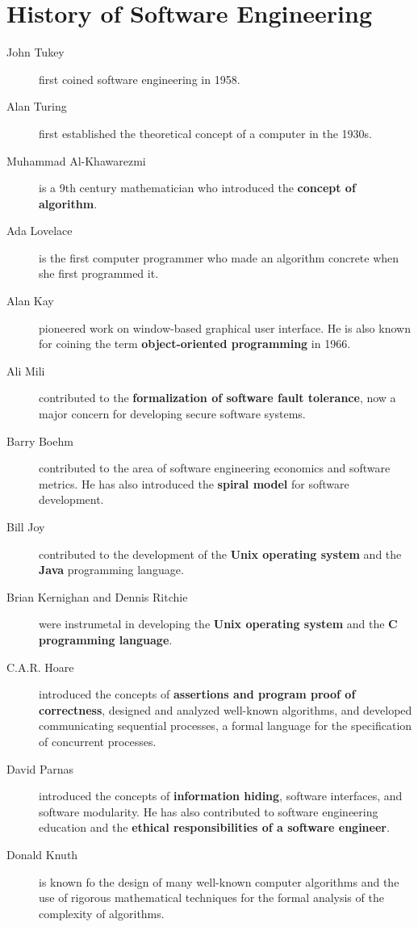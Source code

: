 \documentclass[9pt,twocolumn]{article}
\begin{document}
\section*{History of Software Engineering}
  \begin{description}
    \item[John Tukey] first coined software engineering in 1958.
    \item[Alan Turing] first established the theoretical concept of a computer in the 1930s.
    \item[Muhammad Al-Khawarezmi] is a 9th century mathematician who introduced the \textbf{concept of algorithm}.
    \item[Ada Lovelace] is the first computer programmer who made an algorithm concrete when she first programmed it.
    \item[Alan Kay] pioneered work on window-based graphical user interface. He is also known for coining the term \textbf{object-oriented programming} in 1966.
    \item[Ali Mili] contributed to the \textbf{formalization of software fault tolerance}, now a major concern for developing secure software systems.
    \item[Barry Boehm] contributed to the area of software engineering economics and software metrics. He has also introduced the \textbf{spiral model} for software development.
    \item[Bill Joy] contributed to the development of the \textbf{Unix operating system} and the \textbf{Java} programming language.
    \item[Brian Kernighan and Dennis Ritchie] were instrumetal in developing the \textbf{Unix operating system} and the \textbf{C programming language}.
    \item[C.A.R. Hoare] introduced the concepts of \textbf{assertions and program proof of correctness}, designed and analyzed well-known algorithms, and developed communicating sequential processes, a formal language for the specification of concurrent processes.
    \item[David Parnas] introduced the concepts of \textbf{information hiding}, software interfaces, and software modularity. He has also contributed to software engineering education and the \textbf{ethical responsibilities of a software engineer}.
    \item[Donald Knuth] is known fo the design of many well-known computer algorithms and the use of rigorous mathematical techniques for the formal analysis of the complexity of algorithms.

\end{description}
\end{document}
